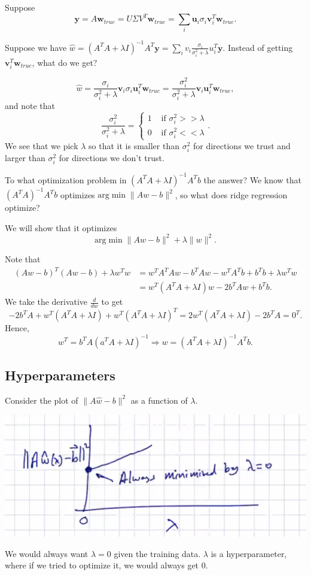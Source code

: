 \documentclass[11pt]{scrartcl}
\newcommand{\Vu}{\mathbf{u}}
\newcommand{\Vv}{\mathbf{v}}
\newcommand{\Vw}{\mathbf{w}}
\newcommand{\Vy}{\mathbf{y}}
\begin{document}
\begin{example} Suppose $$\Vy = A \Vw_{true} = U\Sigma V^T \Vw_{true} = \sum_{i} \Vu_i \sigma_i \Vv_i^T \Vw_{true}.$$ 

Suppose we have $\hat{w} = (A^TA + \lambda I)^{-1} A^T \Vy = \sum_i v_i \frac{\sigma_i}{\sigma_i^2 + \lambda}u_i^T \Vy$.  Instead of getting $\Vv_i^T\Vw_{true}$, what do we get?

$$\hat{w} = \frac{\sigma_i}{\sigma_i^2 + \lambda} \Vv_i \sigma_i \Vu_i^T \Vw_{true} = \frac{\sigma_i^2}{\sigma_i^2 + \lambda} \Vv_i\Vu_i^T \Vw_{true},$$
and note that 
$$ \frac{\sigma_i^2}{\sigma_i^2 + \lambda} = \begin{cases}
1 & \text{ if } \sigma_i^2 >> \lambda \\ 
0 & \text{ if } \sigma_i^2 << \lambda 
\end{cases}.$$
We see that we pick $\lambda$ so that it is smaller than $\sigma_i^2$ for directions we trust and larger than $\sigma_i^2$ for directions we don't trust.
\end{example}

To what optimization problem in $(A^TA + \lambda I)^{-1} A^T b$ the answer? We know that $(A^TA)^{-1}A^Tb$ optimizes $\text{arg}\min\|Aw - b\|^2$, so what does ridge regression optimize?

We will show that it optimizes 
$$\text{arg}\min \|Aw -b \|^2 + \lambda \|w\|^2.$$

Note that 
\begin{align*}
 (Aw-b)^T(Aw-b) + \lambda w^T w &= w^TA^TAw - b^TAw - w^TA^Tb + b^Tb + \lambda w^Tw \\
 &= w^T(A^TA + \lambda I)w - 2b^TAw + b^Tb.
\end{align*}
We take the derivative $\frac{d}{dw}$ to get 
$$-2b^TA + w^T(A^TA + \lambda I) + w^T(A^TA + \lambda I)^T = 2w^T(A^TA + \lambda I) - 2b^TA = 0^T.$$
Hence,
$$w^T = b^TA(a^TA + \lambda I)^{-1} \Rightarrow w = (A^TA + \lambda I)^{-1}A^Tb.$$ 

\subsection{Hyperparameters}
Consider the plot of $\|A\hat{w} - b\|^2$ as a function of $\lambda$.
\begin{center}
\includegraphics[scale=0.75]{lambda.png}
\end{center}
We would always want $\lambda = 0$ given the training data.  $\lambda$ is a hyperparameter, where if we tried to optimize it, we would always get $0$.
\pagebreak
\end{document}
